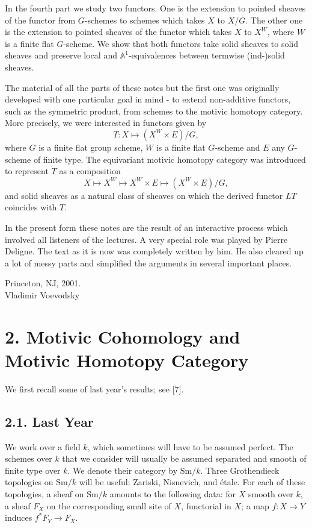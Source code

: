 \documentclass[11pt]{article}
\newcommand{\Aone}{\mathbb A^1}
\newcommand{\Sm}{\mathrm{Sm}}
\theoremstyle{deligne}
\newcommand{\heading}[1]{\vspace{0.7em}\noindent{\bfseries #1}\quad}
\begin{document}
In the fourth part we study two functors. One is the extension to pointed sheaves of the functor from \(G\)-schemes to schemes which takes \(X\) to \(X/G\). The other one is the extension to pointed sheaves of the functor which takes \(X\) to \(X^W\), where \(W\) is a finite flat \(G\)-scheme. We show that both functors take solid sheaves to solid sheaves and preserve local and \(\Aone\)-equivalences between termwise (ind-)solid sheaves.

The material of all the parts of these notes but the first one was originally developed with one particular goal in mind - to extend non-additive functors, such as the symmetric product, from schemes to the motivic homotopy category. More precisely, we were interested in functors given by
\[
  T:X\longmapsto (X^W\times E)/G,
\]
where \(G\) is a finite flat group scheme, \(W\) is a finite flat \(G\)-scheme and \(E\) any \(G\)-scheme of finite type. The equivariant motivic homotopy category was introduced to represent \(T\) as a composition
\[
  X\longmapsto X^W\longmapsto X^W\times E
  \longmapsto (X^W\times E)/G,
\]
and solid sheaves as a natural class of sheaves on which the derived functor \(LT\) coincides with \(T\).

In the present form these notes are the result of an interactive process which involved all listeners of the lectures. A very special role was played by Pierre Deligne. The text as it is now was completely written by him. He also cleared up a lot of messy parts and simplified the arguments in several important places.

\begin{flushright}
Princeton, NJ, 2001.\\
Vladimir Voevodsky
\end{flushright}

\section*{2. Motivic Cohomology and Motivic Homotopy Category}

We first recall some of last year's results; see [7].

\subsection*{2.1. Last Year}

\heading{1.1.} We work over a field \(k\), which sometimes will have to be assumed perfect. The schemes over \(k\) that we consider will usually be assumed separated and smooth of finite type over \(k\). We denote their category by \(\Sm/k\). Three Grothendieck topologies on \(\Sm/k\) will be useful: Zariski, Nisnevich, and étale. For each of these topologies, a sheaf on \(\Sm/k\) amounts to the following data: for \(X\) smooth over \(k\), a sheaf \(F_X\) on the corresponding small site of \(X\), functorial in \(X\); a map \(f:X\to Y\) induces \(f^*F_Y\to F_X\).
\end{document}
